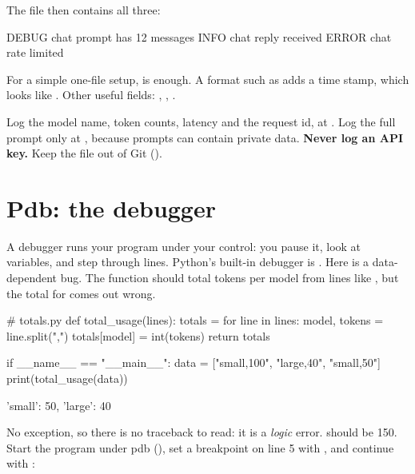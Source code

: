 The file  then contains all three:

\begin{rawcode}
DEBUG chat prompt has 12 messages
INFO chat reply received
ERROR chat rate limited
\end{rawcode}

For a simple one-file setup,  is enough. A format such as
 adds a time stamp, which looks like .
Other useful fields: , , .

\begin{gamerule}
Log the model name, token counts, latency and the request id, at . Log the full prompt only at , because
prompts can contain private data. \textbf{Never log an API key.} Keep the file out of Git ().
\end{gamerule}

\section{Pdb: the debugger}

A debugger runs your program under your control: you pause it, look at variables, and step through lines.
Python's built-in debugger is . Here is a data-dependent bug. The function should total tokens per model from lines like
, but the total for  comes out wrong.

\begin{pycode}
# totals.py
def total_usage(lines):
    totals = {}
    for line in lines:
        model, tokens = line.split(",")
        totals[model] = int(tokens)
    return totals


if __name__ == "__main__":
    data = ["small,100", "large,40", "small,50"]
    print(total_usage(data))
\end{pycode}
\begin{rawcode}
{'small': 50, 'large': 40}
\end{rawcode}

No exception, so there is no traceback to read: it is a \emph{logic} error.  should be 150. Start the program under pdb
(), set a breakpoint on line 5 with , and continue with :

